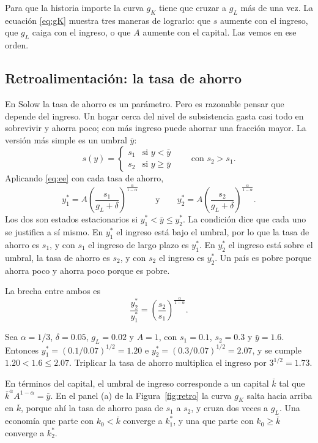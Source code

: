 \documentclass[12pt,letterpaper]{article}
\begin{document}
Para que la historia importe la curva $g_K$ tiene que cruzar a $g_L$ más de una vez. La ecuación \eqref{eq:gK} muestra tres maneras de lograrlo: que $s$ aumente con el ingreso, que $g_L$ caiga con el ingreso, o que $A$ aumente con el capital. Las vemos en ese orden.

\subsection{Retroalimentación: la tasa de ahorro}

En Solow la tasa de ahorro es un parámetro. Pero es razonable pensar que depende del ingreso. Un hogar cerca del nivel de subsistencia gasta casi todo en sobrevivir y ahorra poco; con más ingreso puede ahorrar una fracción mayor. La versión más simple es un umbral $\bar y$:
\[
  s(y)=\begin{cases}s_1 & \text{si } y<\bar y\\ s_2 & \text{si } y\geq\bar y\end{cases}
  \qquad\text{con } s_2>s_1 .
\]
Aplicando \eqref{eq:ee} con cada tasa de ahorro,
\[
  y_1^*=A\left(\frac{s_1}{g_L+\delta}\right)^{\frac{\alpha}{1-\alpha}}
  \qquad\text{y}\qquad
  y_2^*=A\left(\frac{s_2}{g_L+\delta}\right)^{\frac{\alpha}{1-\alpha}} .
\]
Los dos son estados estacionarios si $y_1^*<\bar y\leq y_2^*$. La condición dice que cada uno se justifica a sí mismo. En $y_1^*$ el ingreso está bajo el umbral, por lo que la tasa de ahorro es $s_1$, y con $s_1$ el ingreso de largo plazo es $y_1^*$. En $y_2^*$ el ingreso está sobre el umbral, la tasa de ahorro es $s_2$, y con $s_2$ el ingreso es $y_2^*$. Un país es pobre porque ahorra poco y ahorra poco porque es pobre.

La brecha entre ambos es
\[
  \frac{y_2^*}{y_1^*}=\left(\frac{s_2}{s_1}\right)^{\frac{\alpha}{1-\alpha}} .
\]

\begin{intuicion}
Sea $\alpha=1/3$, $\delta=0.05$, $g_L=0.02$ y $A=1$, con $s_1=0.1$, $s_2=0.3$ y $\bar y=1.6$. Entonces $y_1^*=(0.1/0.07)^{1/2}=1.20$ e $y_2^*=(0.3/0.07)^{1/2}=2.07$, y se cumple $1.20<1.6\leq2.07$. Triplicar la tasa de ahorro multiplica el ingreso por $3^{1/2}=1.73$.
\end{intuicion}

En términos del capital, el umbral de ingreso corresponde a un capital $\bar k$ tal que $\bar k^{\alpha}A^{1-\alpha}=\bar y$. En el panel (a) de la Figura~\ref{fig:retro} la curva $g_K$ salta hacia arriba en $\bar k$, porque ahí la tasa de ahorro pasa de $s_1$ a $s_2$, y cruza dos veces a $g_L$. Una economía que parte con $k_0<\bar k$ converge a $k_1^*$, y una que parte con $k_0\geq\bar k$ converge a $k_2^*$.
\end{document}
